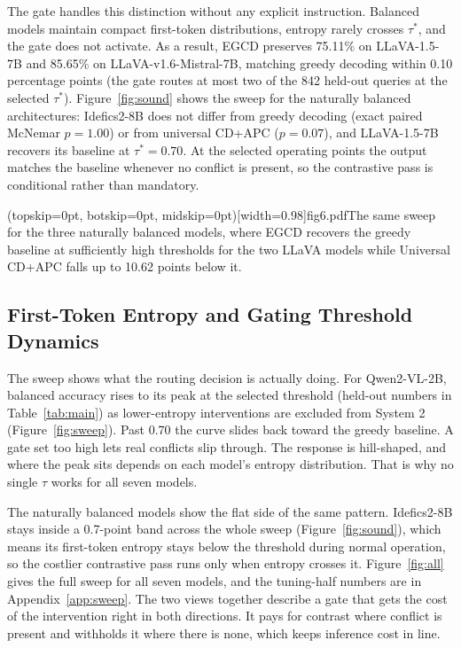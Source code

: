 \documentclass{ieeeaccess}
\begin{document}
The gate handles this distinction without any explicit instruction. Balanced models maintain compact first-token distributions, entropy rarely crosses $\tau^{*}$, and the gate does not activate. As a result, EGCD preserves 75.11\% on LLaVA-1.5-7B and 85.65\% on LLaVA-v1.6-Mistral-7B, matching greedy decoding within 0.10 percentage points (the gate routes at most two of the 842 held-out queries at the selected $\tau^{*}$). Figure~\ref{fig:sound} shows the sweep for the naturally balanced architectures: Idefics2-8B does not differ from greedy decoding (exact paired McNemar $p = 1.00$) or from universal CD+APC ($p = 0.07$), and LLaVA-1.5-7B recovers its baseline at $\tau^{*} = 0.70$. At the selected operating points the output matches the baseline whenever no conflict is present, so the contrastive pass is conditional rather than mandatory.

\Figure[!ht](topskip=0pt, botskip=0pt, midskip=0pt)[width=0.98\columnwidth]{fig6.pdf}{The same sweep for the three naturally balanced models, where EGCD recovers the greedy baseline at sufficiently high thresholds for the two LLaVA models while Universal CD+APC falls up to 10.62 points below it.\label{fig:sound}}

\subsection{First-Token Entropy and Gating Threshold Dynamics}\label{subsec:dynamics}

The sweep shows what the routing decision is actually doing. For Qwen2-VL-2B, balanced accuracy rises to its peak at the selected threshold (held-out numbers in Table~\ref{tab:main}) as lower-entropy interventions are excluded from System 2 (Figure~\ref{fig:sweep}). Past 0.70 the curve slides back toward the greedy baseline. A gate set too high lets real conflicts slip through. The response is hill-shaped, and where the peak sits depends on each model's entropy distribution. That is why no single $\tau$ works for all seven models.

The naturally balanced models show the flat side of the same pattern. Idefics2-8B stays inside a 0.7-point band across the whole sweep (Figure~\ref{fig:sound}), which means its first-token entropy stays below the threshold during normal operation, so the costlier contrastive pass runs only when entropy crosses it. Figure~\ref{fig:all} gives the full sweep for all seven models, and the tuning-half numbers are in Appendix~\ref{app:sweep}. The two views together describe a gate that gets the cost of the intervention right in both directions. It pays for contrast where conflict is present and withholds it where there is none, which keeps inference cost in line.
\end{document}
